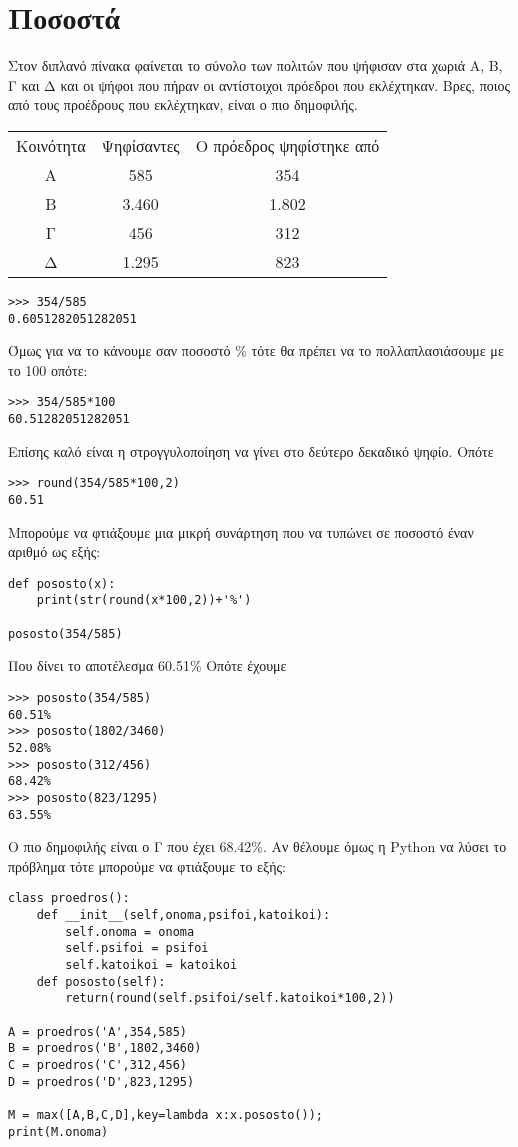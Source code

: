 \chapter{Ποσοστά}
Στον διπλανό πίνακα φαίνεται το σύνολο των
πολιτών που ψήφισαν στα χωριά
Α, Β, Γ και Δ και οι ψήφοι που πήραν οι
αντίστοιχοι πρόεδροι που εκλέχτηκαν.
Βρες, ποιος από τους προέδρους που
εκλέχτηκαν, είναι ο πιο δημοφιλής.

\begin{tabular}{ccc}
Κοινότητα & Ψηφίσαντες & Ο πρόεδρος ψηφίστηκε από\\
A& 585& 354\\
B& 3.460& 1.802\\
Γ& 456&312\\
Δ&1.295&823\\
\end{tabular}	

\begin{lstlisting}
>>> 354/585
0.6051282051282051
\end{lstlisting}
Όμως για να το κάνουμε σαν ποσοστό \% τότε θα πρέπει να το πολλαπλασιάσουμε με το 100 οπότε:
\begin{lstlisting}
>>> 354/585*100
60.51282051282051
\end{lstlisting}
Επίσης καλό είναι η στρογγυλοποίηση να γίνει στο δεύτερο δεκαδικό ψηφίο. Οπότε 
\begin{lstlisting}
>>> round(354/585*100,2)
60.51
\end{lstlisting}
Μπορούμε να φτιάξουμε μια μικρή συνάρτηση που να τυπώνει σε ποσοστό έναν αριθμό ως εξής:
\begin{lstlisting}
def pososto(x):
    print(str(round(x*100,2))+'%')

pososto(354/585)
\end{lstlisting}

Που  δίνει το αποτέλεσμα 60.51\%
Οπότε έχουμε
\begin{lstlisting}
>>> pososto(354/585)
60.51%
>>> pososto(1802/3460)
52.08%
>>> pososto(312/456)
68.42%
>>> pososto(823/1295)
63.55%
\end{lstlisting}

Ο πιο δημοφιλής είναι ο Γ που έχει 68.42\%.
Αν θέλουμε όμως η Python να λύσει το πρόβλημα τότε μπορούμε να φτιάξουμε το εξής:
\begin{lstlisting}
class proedros():
    def __init__(self,onoma,psifoi,katoikoi):
        self.onoma = onoma
        self.psifoi = psifoi
        self.katoikoi = katoikoi
    def pososto(self):
        return(round(self.psifoi/self.katoikoi*100,2))

A = proedros('A',354,585)
B = proedros('B',1802,3460)
C = proedros('C',312,456)
D = proedros('D',823,1295)

M = max([A,B,C,D],key=lambda x:x.pososto());
print(M.onoma)
\end{lstlisting}

